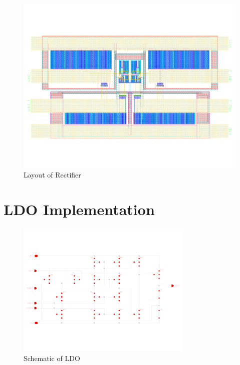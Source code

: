 \documentclass[12pt,a4paper,UKenglish]{report}
\begin{document}
\begin{appendices}
\begin{figure} [!htbp] %
 	\centering
  	\includegraphics[width=\textwidth]{appendix/layout_rectifier_l.pdf} 
 	\caption{Layout of Rectifier} 
	\label{fig:appen_layout_rectifer} 
\end{figure}


\chapter{LDO Implementation}

\begin{figure} [!htbp]	%
 	\centering
  	\includegraphics[angle=90, width=0.75\textwidth]{appendix/schematic_ldo_l.pdf} 
 	\caption{Schematic of LDO} 
	\label{fig:appen_schematic_ldo} 
\end{figure}


\end{appendices}
\end{document}
